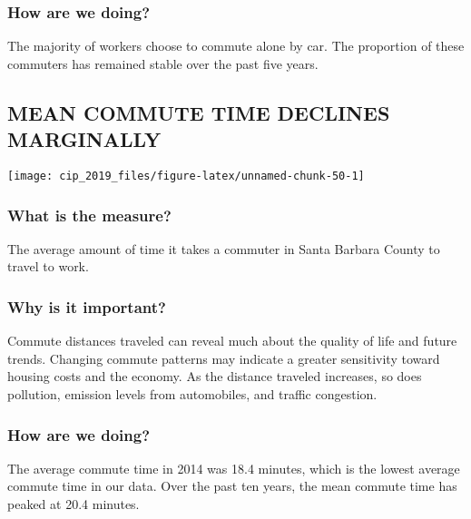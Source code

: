 \documentclass[]{book}
\theoremstyle{definition}
\theoremstyle{definition}
\theoremstyle{definition}
\theoremstyle{remark}
\begin{document}
\subsubsection*{How are we doing?}\label{how-are-we-doing-30}

The majority of workers choose to commute alone by car. The proportion
of these commuters has remained stable over the past five years.

\subsection*{MEAN COMMUTE TIME DECLINES
MARGINALLY}\label{mean-commute-time-declines-marginally}

\texttt{[image: cip\_2019\_files/figure-latex/unnamed-chunk-50-1]}

\subsubsection*{What is the measure?}\label{what-is-the-measure-25}

The average amount of time it takes a commuter in Santa Barbara County
to travel to work.

\subsubsection*{Why is it important?}\label{why-is-it-important-24}

Commute distances traveled can reveal much about the quality of life and
future trends. Changing commute patterns may indicate a greater
sensitivity toward housing costs and the economy. As the distance
traveled increases, so does pollution, emission levels from automobiles,
and traffic congestion.

\subsubsection*{How are we doing?}\label{how-are-we-doing-31}

The average commute time in 2014 was 18.4 minutes, which is the lowest
average commute time in our data. Over the past ten years, the mean
commute time has peaked at 20.4 minutes.
\end{document}
